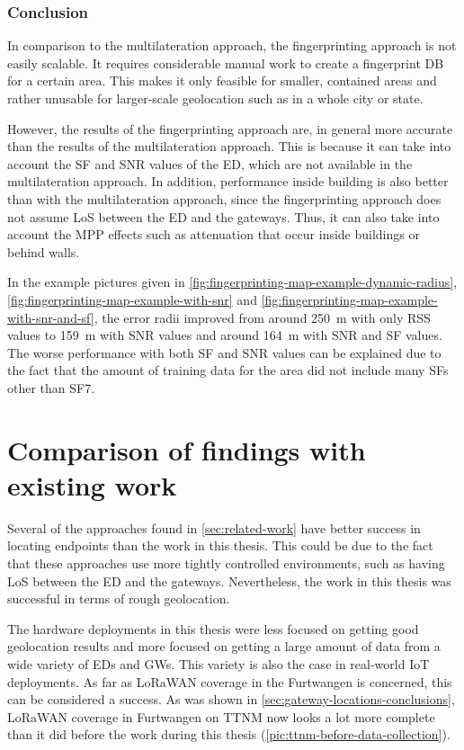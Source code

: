 \subsubsection{Conclusion}

In comparison to the multilateration approach, the fingerprinting approach is not easily scalable.
It requires considerable manual work to create a fingerprint \ac{DB} for a certain area.
This makes it only feasible for smaller, contained areas and rather unusable for larger-scale geolocation such as in a whole city or state.

However, the results of the fingerprinting approach are, in general more accurate than the results of the multilateration approach.
This is because it can take into account the \ac{SF} and \ac{SNR} values of the \acl{ED}, which are not available in the multilateration approach.
In addition, performance inside building is also better than with the multilateration approach, since the fingerprinting approach does not assume \ac{LoS} between the \acl{ED} and the gateways.
Thus, it can also take into account the \ac{MPP} effects such as attenuation that occur inside buildings or behind walls.

In the example pictures given in \cref{fig:fingerprinting-map-example-dynamic-radius}, \cref{fig:fingerprinting-map-example-with-snr} and \cref{fig:fingerprinting-map-example-with-snr-and-sf}, the error radii improved from around \SI{250}{\meter} with only \ac{RSS} values to \SI{159}{\meter} with \ac{SNR} values and around \SI{164}{\meter} with \ac{SNR} and \ac{SF} values.
The worse performance with both \ac{SF} and \ac{SNR} values can be explained due to the fact that the amount of training data for the area did not include many \aclp{SF} other than \acs{SF}7.

\section{Comparison of findings with existing work}

Several of the approaches found in \cref{sec:related-work} have better success in locating endpoints than the work in this thesis.
This could be due to the fact that these approaches use more tightly controlled environments, such as having \ac{LoS} between the \acl{ED} and the gateways.
Nevertheless, the work in this thesis was successful in terms of rough geolocation.

The hardware deployments in this thesis were less focused on getting good geolocation results and more focused on getting a large amount of data from a wide variety of \aclp{ED} and \aclp{GW}.
This variety is also the case in real-world \ac{IoT} deployments.
As far as \ac{LoRaWAN} coverage in the Furtwangen is concerned, this can be considered a success.
As was shown in \cref{sec:gateway-locations-conclusions}, \ac{LoRaWAN} coverage in Furtwangen on \ac{TTNM} now looks a lot more complete than it did before the work during this thesis (\cref{pic:ttnm-before-data-collection}).

